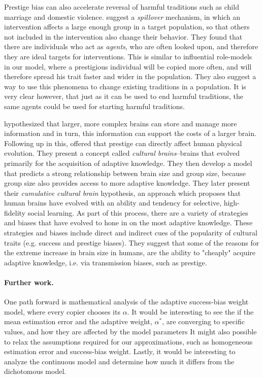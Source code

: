 \documentclass[12pt]{extarticle}
\begin{document}
Prestige bias can also accelerate reversal of harmful traditions such as child marriage and domestic violence. 
\citet{harmful_traditions} suggest a \textit{spillover}  mechanism, in which an intervention affects a large enough group in a target population, so that others not included in the intervention also change their behavior.
They found that there are individuals who act as \textit{agents}, who are often looked upon, and therefore they are ideal targets for interventions. This is similar to influential role-models in our model, where a prestigious individual will be copied more often, and will therefore spread his trait faster and wider in the population.
They also suggest a way to use this phenomena to change existing traditions in a population. It is very clear however, that just as it can be used to end harmful traditions, the same agents could be used for starting harmful traditions.


\citet{social_brains} hypothesized that larger, more complex brains can store and manage more information and in turn, this information can support the costs of a larger brain.
Following up in this, \citet{collective_brains} offered that prestige can directly affect human physical evolution. They present a concept called \textit{cultural brains}--brains that evolved primarily for the acquisition of adaptive knowledge.
They then develop a model that predicts a strong relationship between brain size and group size, because group size also provides access to more adaptive knowledge. They later present their \textit{cumulative cultural brain} hypothesis, an approach which proposes that human brains have evolved with an ability and tendency for selective, high-fidelity social learning. As part of this process, there are a variety of strategies and biases that have evolved to hone in on the most adaptive knowledge. These strategies and biases include direct and indirect cues of the popularity of cultural traits (e.g. success and prestige biases).
They suggest that some of the reasons for the extreme increase in brain size in humans, are the ability to "cheaply" acquire adaptive knowledge, i.e. via transmission biases, such as prestige.

\paragraph{Further work.}
One path forward is mathematical analysis of the adaptive success-bias weight model, where every copier chooses its $\alpha$. It would be interesting to see the if the mean estimation error and the adaptive weight, $\alpha^*$, are converging to specific values, and how they are affected by the model parameters
It might also possible to relax the assumptions required for our approximations, such as homogeneous estimation error and success-bias weight.
Lastly, it would be interesting to analyze the continuous model and determine how much it differs from the dichotomous model. 
\end{document}
